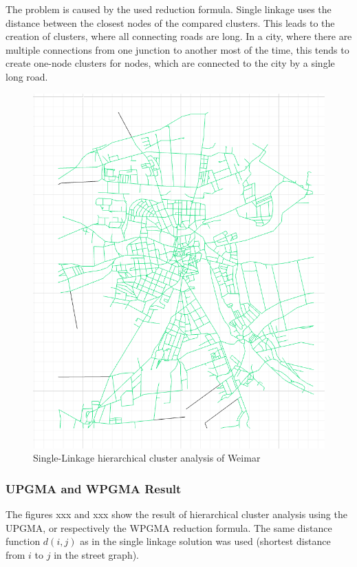 \documentclass[11pt, a4paper]{report}
\begin{document}
The problem is caused by the used reduction formula. Single linkage uses the distance between the closest nodes of the compared clusters. This leads to the creation of clusters, where all connecting roads are long. In a city, where there are multiple connections from one junction to another most of the time, this tends to create one-node clusters for nodes, which are connected to the city by a single long road.

\begin{figure}[!h]
    \centering
    \includegraphics[width=\textwidth]{clusteranalysis_singlelinkage.png}
    \caption{Single-Linkage hierarchical cluster analysis of Weimar\label{fig:SingleLinkage}}
\end{figure}

\subsubsection{UPGMA and WPGMA Result}
The figures xxx and xxx show the result of hierarchical cluster analysis using the UPGMA, or respectively the WPGMA reduction formula. The same distance function $d(i, j)$ as in the single linkage solution was used (shortest distance from $i$ to $j$ in the street graph).
\end{document}
